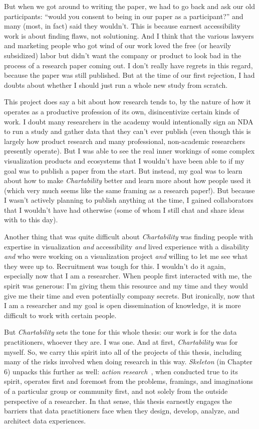 \documentclass[12pt]{cmuthesis}
\begin{document}
But when we got around to writing the paper, we had to go back and ask our old participants: ``would you consent to being in our paper as a participant?'' and many (most, in fact) said they wouldn't. This is because earnest accessibility work is about finding flaws, not solutioning. And I think that the various lawyers and marketing people who got wind of our work loved the free (or heavily subsidized) labor but didn't want the company or product to look bad in the process of a research paper coming out. I don't really have regrets in this regard, because the paper was still published. But at the time of our first rejection, I had doubts about whether I should just run a whole new study from scratch.

This project does say a bit about how research tends to, by the nature of how it operates as a productive profession of its own, disincentivize certain kinds of work. I doubt many researchers in the academy would intentionally sign an NDA to run a study and gather data that they can't ever publish (even though this is largely how product research and many professional, non-academic researchers presently operate). But I was able to see the real inner workings of some complex visualization products and ecosystems that I wouldn't have been able to if my goal was to publish a paper from the start. But instead, my goal was to learn about how to make \textit{Chartability} better and learn more about how people used it (which very much seems like the same framing as a research paper!). But because I wasn't actively planning to publish anything at the time, I gained collaborators that I wouldn't have had otherwise (some of whom I still chat and share ideas with to this day).

Another thing that was quite difficult about \textit{Chartability} was finding people with expertise in visualization \textit{and} accessibility \textit{and} lived experience with a disability \textit{and} who were working on a visualization project \textit{and} willing to let me see what they were up to. Recruitment was tough for this. I wouldn't do it again, especially now that I am a researcher. When people first interacted with me, the spirit was generous: I'm giving them this resource and my time and they would give me their time and even potentially company secrets. But ironically, now that I am a researcher and my goal is open dissemination of knowledge, it is more difficult to work with certain people.

But \textit{Chartability} sets the tone for this whole thesis: our work is for the data practitioners, whoever they are. I was one. And at first, \textit{Chartability} was for myself. So, we carry this spirit into all of the projects of this thesis, including many of the risks involved when doing research in this way. \textit{Skeleton} (in Chapter 6) unpacks this further as well: \textit{action research}~\cite{Hayes2011ActionResearch}, when conducted true to its spirit, operates first and foremost from the problems, framings, and imaginations of a particular group or community first, and not solely from the outside perspective of a researcher. In that sense, this thesis earnestly engages the barriers that data practitioners face when they design, develop, analyze, and architect data experiences.
\end{document}
